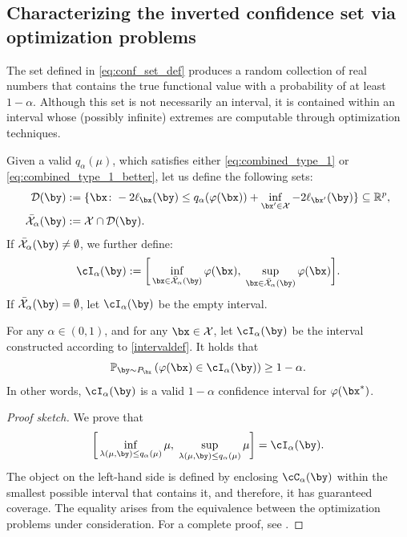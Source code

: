 \documentclass[11pt]{article}
\numberwithin{equation}{section}
\numberwithin{figure}{section}
\begin{document}
\subsection{Characterizing the inverted confidence set via optimization problems} \label{subsec:conf_set_as_opt}

The set defined in \eqref{eq:conf_set_def} produces a random collection of real numbers that contains the true functional value with a probability of at least $1 - \alpha$. 
Although this set is not necessarily an interval, it is contained within an interval whose (possibly infinite) extremes are computable through optimization techniques.

Given a valid $q_\alpha(\mu)$, which satisfies either \eqref{eq:combined_type_1} or \eqref{eq:combined_type_1_better}, let us define the following sets:
\begin{align}
\mathcal{D}(\by) &:= \{ \bx \colon -2\ell_{\bx}(\by) \leq q_\alpha(\varphi(\bx)) + \inf_{\bx' \in \mathcal X} -2\ell_{\bx'}(\by) \} \subseteq \mathbb R^p, \label{eq:defD}\\
\bar{\mathcal X}_\alpha(\by) &:= \mathcal X \cap \mathcal{D}(\by). \label{eq:defcalX}
\end{align}
If $\bar{\mathcal X}_\alpha(\by) \neq \emptyset$, we further define:
\begin{equation} \label{intervaldef}
\cI_\alpha(\by) := \bigg [\inf_{\bx \in \bar{\mathcal X}_\alpha(\by)} \varphi(\bx),\; \sup_{\bx \in \bar{\mathcal X}_\alpha(\by)} \varphi(\bx) \bigg ].
\end{equation}
If $\bar{\mathcal X}_\alpha(\by) = \emptyset$, let $\cI_\alpha(\by)$ be the empty interval.
\begin{theorem} 
\label{thm:interval_coverage} 
    For any $\alpha \in (0, 1)$, and for any $\bx \in \mathcal{X}$, let $\cI_\alpha(\by)$ be the interval constructed according to \eqref{intervaldef}.
    It holds that
    \begin{equation*}
    \mathbb{P}_{\by \sim P_{\bx}} \left(\varphi(\bx) \in \cI_\alpha(\by) \right) \geq 1-\alpha.
    \end{equation*}
    In other words, $\cI_\alpha(\by)$ is a valid $1-\alpha$ confidence interval for $\varphi(\bx^*)$.
\end{theorem}
\begin{proof}[Proof sketch]
We prove that
\begin{equation}
\bigg [\inf_{\lambda(\mu, \by) \leq q_\alpha(\mu)} \mu,\; 
\sup_{\lambda(\mu, \by) \leq q_\alpha(\mu)} \mu \bigg ] = \cI_\alpha(\by).
\end{equation}
The object on the left-hand side is defined by enclosing $\cC_\alpha(\by)$ within the smallest possible interval that contains it, and therefore, it has guaranteed coverage. 
The equality arises from the equivalence between the optimization problems under consideration.
For a complete proof, see .
\end{proof}
\end{document}
